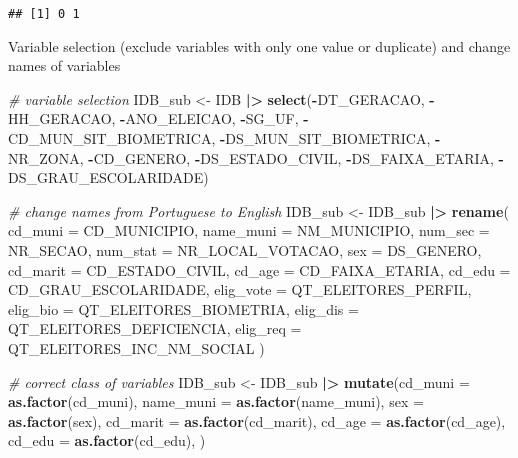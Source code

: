 \documentclass[
]{article}
\newenvironment{Shaded}{\begin{snugshade}}{\end{snugshade}}
\newcommand{\AttributeTok}[1]{\textcolor[rgb]{0.13,0.29,0.53}{#1}}
\newcommand{\CommentTok}[1]{\textcolor[rgb]{0.56,0.35,0.01}{\textit{#1}}}
\newcommand{\FunctionTok}[1]{\textcolor[rgb]{0.13,0.29,0.53}{\textbf{#1}}}
\newcommand{\NormalTok}[1]{#1}
\newcommand{\OtherTok}[1]{\textcolor[rgb]{0.56,0.35,0.01}{#1}}
\newcommand{\SpecialCharTok}[1]{\textcolor[rgb]{0.81,0.36,0.00}{\textbf{#1}}}
\begin{document}
\begin{Shaded}
\end{Shaded}

\begin{verbatim}
## [1] 0 1
\end{verbatim}

Variable selection (exclude variables with only one value or duplicate)
and change names of variables

\begin{Shaded}
\begin{Highlighting}[]
\CommentTok{\# variable selection}
\NormalTok{IDB\_sub }\OtherTok{\textless{}{-}}\NormalTok{ IDB }\SpecialCharTok{|\textgreater{}}
  \FunctionTok{select}\NormalTok{(}\SpecialCharTok{{-}}\NormalTok{DT\_GERACAO, }\SpecialCharTok{{-}}\NormalTok{HH\_GERACAO, }\SpecialCharTok{{-}}\NormalTok{ANO\_ELEICAO, }\SpecialCharTok{{-}}\NormalTok{SG\_UF, }\SpecialCharTok{{-}}\NormalTok{CD\_MUN\_SIT\_BIOMETRICA, }\SpecialCharTok{{-}}\NormalTok{DS\_MUN\_SIT\_BIOMETRICA, }\SpecialCharTok{{-}}\NormalTok{NR\_ZONA, }\SpecialCharTok{{-}}\NormalTok{CD\_GENERO, }\SpecialCharTok{{-}}\NormalTok{DS\_ESTADO\_CIVIL, }\SpecialCharTok{{-}}\NormalTok{DS\_FAIXA\_ETARIA, }\SpecialCharTok{{-}}\NormalTok{DS\_GRAU\_ESCOLARIDADE)}

\CommentTok{\# change names from Portuguese to English}
\NormalTok{IDB\_sub }\OtherTok{\textless{}{-}}\NormalTok{ IDB\_sub }\SpecialCharTok{|\textgreater{}}
  \FunctionTok{rename}\NormalTok{(}
    \AttributeTok{cd\_muni =}\NormalTok{ CD\_MUNICIPIO,}
    \AttributeTok{name\_muni =}\NormalTok{ NM\_MUNICIPIO,}
    \AttributeTok{num\_sec =}\NormalTok{ NR\_SECAO,}
    \AttributeTok{num\_stat =}\NormalTok{ NR\_LOCAL\_VOTACAO,}
    \AttributeTok{sex =}\NormalTok{ DS\_GENERO,}
    \AttributeTok{cd\_marit =}\NormalTok{ CD\_ESTADO\_CIVIL,}
    \AttributeTok{cd\_age =}\NormalTok{ CD\_FAIXA\_ETARIA,}
    \AttributeTok{cd\_edu =}\NormalTok{ CD\_GRAU\_ESCOLARIDADE,}
    \AttributeTok{elig\_vote =}\NormalTok{ QT\_ELEITORES\_PERFIL,}
    \AttributeTok{elig\_bio =}\NormalTok{ QT\_ELEITORES\_BIOMETRIA,}
    \AttributeTok{elig\_dis =}\NormalTok{ QT\_ELEITORES\_DEFICIENCIA,}
    \AttributeTok{elig\_req =}\NormalTok{ QT\_ELEITORES\_INC\_NM\_SOCIAL}
\NormalTok{  )}

\CommentTok{\# correct class of variables}
\NormalTok{IDB\_sub }\OtherTok{\textless{}{-}}\NormalTok{ IDB\_sub }\SpecialCharTok{|\textgreater{}}
  \FunctionTok{mutate}\NormalTok{(}\AttributeTok{cd\_muni =} \FunctionTok{as.factor}\NormalTok{(cd\_muni),}
         \AttributeTok{name\_muni =} \FunctionTok{as.factor}\NormalTok{(name\_muni),}
         \AttributeTok{sex =} \FunctionTok{as.factor}\NormalTok{(sex),}
         \AttributeTok{cd\_marit =} \FunctionTok{as.factor}\NormalTok{(cd\_marit),}
         \AttributeTok{cd\_age =} \FunctionTok{as.factor}\NormalTok{(cd\_age),}
         \AttributeTok{cd\_edu =} \FunctionTok{as.factor}\NormalTok{(cd\_edu),}
\NormalTok{         )}


\end{Highlighting}
\end{Shaded}
\end{document}

